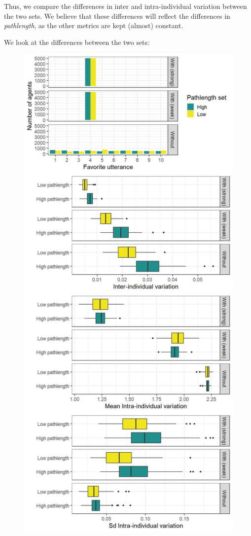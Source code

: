 \documentclass[
]{article}
\begin{document}
Thus, we compare the differences in inter and intra-individual variation
between the two sets. We believe that these differences will reflect the
differences in \emph{pathlength}, as the other metrics are kept (almost)
constant.

We look at the differences between the two sets:

\begin{figure}[!H]

{\centering \includegraphics{./Figures/unnamed-chunk-6-1} 

}
\end{figure}
\end{document}
